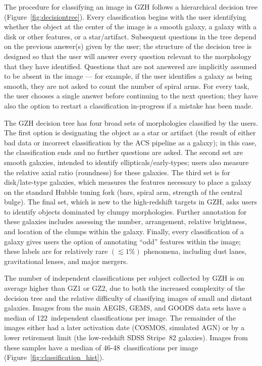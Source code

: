 \documentclass[twocolumn]{aastex6}
\begin{document}
The procedure for classifying an image in GZH follows a hierarchical decision tree (Figure~\ref{fig:decisiontree}). Every classification begins with the user identifying whether the object at the center of the image is a smooth galaxy, a galaxy with a disk or other features, or a star/artifact. Subsequent questions in the tree depend on the previous answer(s) given by the user; the structure of the decision tree is designed so that the user will answer every question relevant to the morphology that they have identified. Questions that are not answered are implicitly assumed to be absent in the image --- for example, if the user identifies a galaxy as being smooth, they are not asked to count the number of spiral arms. For every task, the user chooses a single answer before continuing to the next question; they have also the option to restart a classification in-progress if a mistake has been made. 

The GZH decision tree has four broad sets of morphologies classified by the users. The first option is designating the object as a star or artifact (the result of either bad data or incorrect classification by the ACS pipeline as a galaxy); in this case, the classification ends and no further questions are asked. The second set are smooth galaxies, intended to identify ellipticals/early-types; users also measure the relative axial ratio (roundness) for these galaxies. The third set is for disk/late-type galaxies, which measures the features necessary to place a galaxy on the standard Hubble tuning fork (bars, spiral arm, strength of the central bulge). The final set, which is new to the high-redshift targets in GZH, asks users to identify objects dominated by clumpy morphologies. Further annotation for these galaxies includes assessing the number, arrangement, relative brightness, and location of the clumps within the galaxy. Finally, every classification of a galaxy gives users the option of annotating ``odd'' features within the image; these labels are for relatively rare $(\lesssim1\%)$ phenomena, including dust lanes, gravitational lenses, and major mergers. 

The number of independent classifications per subject collected by GZH is on average higher than GZ1 or GZ2, due to both the increased complexity of the decision tree and the relative difficulty of classifying images of small and distant galaxies. Images from the main AEGIS, GEMS, and GOODS data sets have a median of 122~independent classifications per image. The remainder of the images either had a later activation date (COSMOS, simulated AGN) or by a lower retirement limit (the low-redshift SDSS Stripe~82 galaxies). Images from these samples have a median of 46-48~classifications per image (Figure~\ref{fig:classification_hist}).
\end{document}
